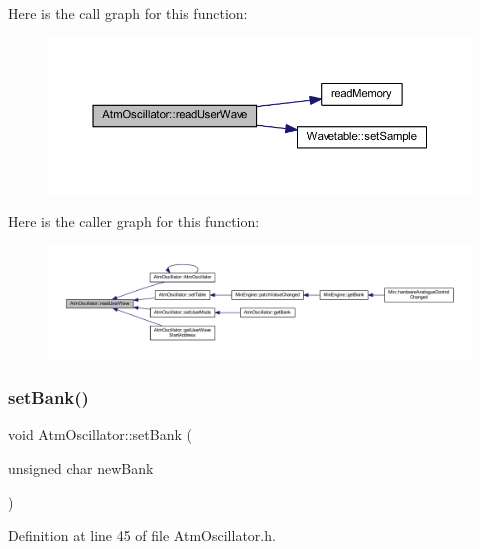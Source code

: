 Here is the call graph for this function\+:
\nopagebreak
\begin{figure}[H]
\begin{center}
\leavevmode
\includegraphics[width=350pt]{d8/d5f/class_atm_oscillator_a08b383cd2305c232de827399aa8d2ccb_cgraph}
\end{center}
\end{figure}
Here is the caller graph for this function\+:
\nopagebreak
\begin{figure}[H]
\begin{center}
\leavevmode
\includegraphics[width=350pt]{d8/d5f/class_atm_oscillator_a08b383cd2305c232de827399aa8d2ccb_icgraph}
\end{center}
\end{figure}
\mbox{\label{class_atm_oscillator_a9f65ae9f2132c46f73b776a869b5bf21}} 
\subsubsection{\texorpdfstring{set\+Bank()}{setBank()}}
{\footnotesize\ttfamily void Atm\+Oscillator\+::set\+Bank (\begin{DoxyParamCaption}\item[{unsigned char}]{new\+Bank }\end{DoxyParamCaption})\hspace{0.3cm}{\ttfamily [inline]}}



Definition at line 45 of file Atm\+Oscillator.\+h.

